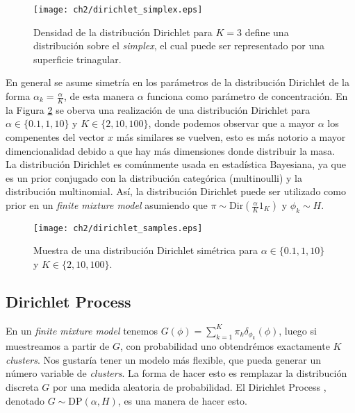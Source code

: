 \documentclass[letterpaper,12pt,oneside]{book} %
\begin{document}
\begin{figure}
    \centering
    \texttt{[image: ch2/dirichlet\_simplex.eps]}
    \caption{Densidad de la distribución Dirichlet para $K=3$ define una distribución sobre el \textit{simplex}, el cual puede ser representado por una superficie trinagular.}
    \label{img:dirichlet_distribution}
\end{figure}

En general se asume simetría en los parámetros de la distribución Dirichlet de la forma $\alpha_{k}=\frac{\alpha}{K}$, de esta manera $\alpha$ funciona como parámetro de concentración. En la Figura \ref{img:dirichlet_samples} se oberva una realización de una distribución Dirichlet para $\alpha \in \{0.1, 1, 10\}$ y $K\in\{2, 10, 100\}$, donde podemos observar que a mayor $\alpha$ los compenentes del vector $x$ más similares se vuelven, esto es más notorio a mayor dimencionalidad debido a que hay más dimensiones donde distribuir la masa.\\

La distribución Dirichlet es comúnmente usada en estadística Bayesiana, ya que es un prior conjugado con la distribución categórica (multinoulli) y la distribución multinomial. Así, la distribución Dirichlet puede ser utilizado como prior en un \textit{finite mixture model} asumiendo que $\pi\sim \text{Dir}(\frac{\alpha}{K}1_{K})$ y $\phi_{k} \sim H$.

\begin{figure}
    \centering
    \texttt{[image: ch2/dirichlet\_samples.eps]}
    \caption{Muestra de una distribución Dirichlet simétrica para $\alpha \in \{0.1, 1, 10\}$ y $K\in\{2, 10, 100\}$.}
    \label{img:dirichlet_samples}
\end{figure}

\subsection{Dirichlet Process}
\label{sec:dp}

En un \textit{finite mixture model} tenemos $G(\phi) = \sum_{k=1}^{K} \pi_{k}\delta_{\phi_{k}}(\phi)$, luego si muestreamos a partir de $G$, con probabilidad uno obtendrémos exactamente $K$ \textit{clusters}. Nos gustaría tener un modelo más flexible, que pueda generar un número variable de \textit{clusters}. La forma de hacer esto es remplazar la distribución discreta $G$ por una medida aleatoria de probabilidad. El Dirichlet Process \citep{ferguson1973bayesian}, denotado $G\sim \text{DP}(\alpha, H)$, es una manera de hacer esto.\\
\end{document}
